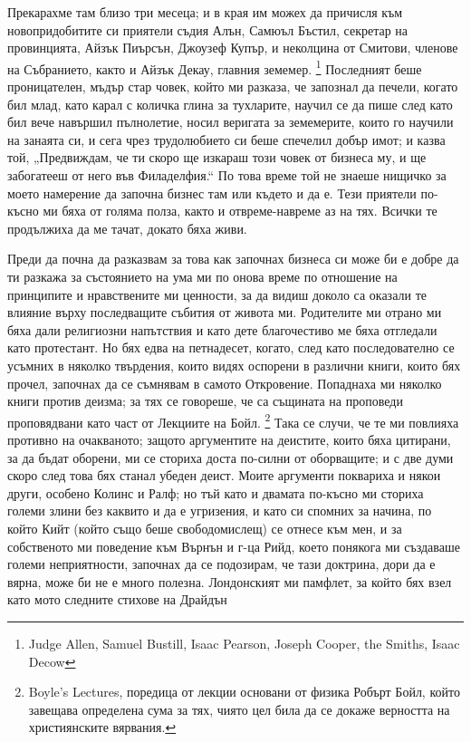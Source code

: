 \documentclass[12pt]{book}
\begin{document}
Прекарахме там близо три месеца; и в края им можех да причисля към новопридобитите си приятели съдия Алън, Самюъл Бъстил, секретар на провинцията, Айзък Пиърсън, Джоузеф Купър, и неколцина от Смитови, членове на Събранието, както и Айзък Декау, главния земемер. \footnote{Judge Allen, Samuel Bustill, Isaac Pearson, Joseph Cooper, the Smiths, Isaac Decow} Последният беше проницателен, мъдър стар човек, който ми разказа, че запознал да печели, когато бил млад, като карал с количка глина за тухларите, научил се да пише след като бил вече навършил пълнолетие, носил веригата за земемерите, които го научили на занаята си, и сега чрез трудолюбието си беше спечелил добър имот; и казва той, „Предвиждам, че ти скоро ще изкараш този човек от бизнеса му, и ще забогатееш от него във Филаделфия.“ По това време той не знаеше нищичко за моето намерение да започна бизнес там или където и да е. Тези приятели по-късно ми бяха от голяма полза, както и отвреме-навреме аз на тях. Всички те продължиха да ме тачат, докато бяха живи.

Преди да почна да разказвам за това как започнах бизнеса си може би е добре да ти разкажа за състоянието на ума ми по онова време по отношение на принципите и нравствените ми ценности, за да видиш доколо са оказали те влияние върху последващите събития от живота ми. Родителите ми отрано ми бяха дали религиозни напътствия и като дете благочестиво ме бяха отгледали като протестант. Но бях едва на петнадесет, когато, след като последователно се усъмних в няколко твърдения, които видях оспорени в различни книги, които бях прочел, започнах да се съмнявам в самото Откровение. Попаднаха ми няколко книги против деизма; за тях се говореше, че са същината на проповеди проповядвани като част от Лекциите на Бойл. \footnote{Boyle's Lectures, поредица от лекции основани от физика Робърт Бойл, който завещава определена сума за тях, чиято цел била да се докаже верността на християнските вярвания.} Така се случи, че те ми повлияха противно на очакваното; защото аргументите на деистите, които бяха цитирани, за да бъдат оборени, ми се сториха доста по-силни от оборващите; и с две думи скоро след това бях станал убеден деист. Моите аргументи поквариха и някои други, особено Колинс и Ралф; но тъй като и двамата по-късно ми сториха големи злини без каквито и да е угризения, и като си спомних за начина, по който Кийт (който също беше свободомислещ) се отнесе към мен, и за собственото ми поведение към Върнън и г-ца Рийд, което понякога ми създаваше големи неприятности, започнах да се подозирам, че тази доктрина, дори да е вярна, може би не е много полезна. Лондонският ми памфлет, за който бях взел като мото следните стихове на Драйдън 
\end{document}
